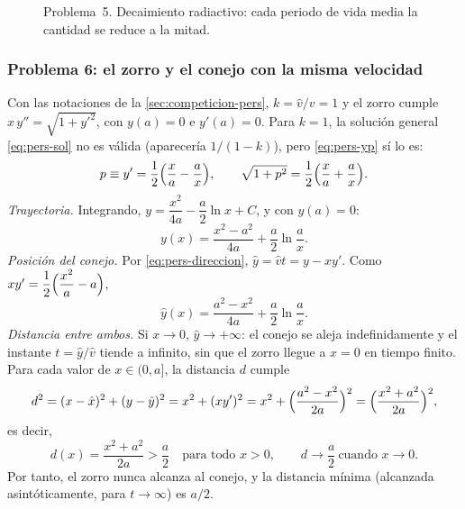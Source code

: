 \begin{figure}[H]
  \centering
  \caption{Problema~5. Decaimiento radiactivo: cada periodo de vida media la cantidad se reduce a la mitad.}
  \label{fig:p5}
\end{figure}

\subsubsection*{Problema 6: el zorro y el conejo con la misma velocidad}

\begin{solucion}
Con las notaciones de la \cref{sec:competicion-pers}, $k=\hat v/v=1$ y el zorro cumple $x\,y''=\sqrt{1+y'^2}$, con $y(a)=0$ e $y'(a)=0$. Para $k=1$, la solución general \eqref{eq:pers-sol} no es válida (aparecería $1/(1-k)$), pero \eqref{eq:pers-yp} sí lo es:
\[
  p\equiv y'=\frac12\Bigl(\frac xa-\frac ax\Bigr),\qquad
  \sqrt{1+p^2}=\frac12\Bigl(\frac xa+\frac ax\Bigr).
\]
\emph{Trayectoria.} Integrando, $y=\dfrac{x^2}{4a}-\dfrac a2\ln x+C$, y con $y(a)=0$:
\[
  y(x)=\frac{x^2-a^2}{4a}+\frac a2\ln\frac ax .
\]
\emph{Posición del conejo.} Por \eqref{eq:pers-direccion}, $\hat y=\hat vt=y-xy'$. Como $xy'=\dfrac12\Bigl(\dfrac{x^2}{a}-a\Bigr)$,
\[
  \hat y(x)=\frac{a^2-x^2}{4a}+\frac a2\ln\frac ax .
\]
\emph{Distancia entre ambos.} Si $x\to0$, $\hat y\to+\infty$: el conejo se aleja indefinidamente y el instante $t=\hat y/\hat v$ tiende a infinito, sin que el zorro llegue a $x=0$ en tiempo finito. Para cada valor de $x\in(0,a]$, la distancia $d$ cumple
\[
  d^2=(x-\hat x)^2+(y-\hat y)^2=x^2+(xy')^2=x^2+\Bigl(\frac{a^2-x^2}{2a}\Bigr)^{2}=\Bigl(\frac{x^2+a^2}{2a}\Bigr)^{2},
\]
es decir,
\begin{equation}
  d(x)=\frac{x^2+a^2}{2a}>\frac a2\quad\text{para todo }x>0,
  \qquad d\to\frac a2\ \text{cuando }x\to0 .
  \label{eq:p6-d}
\end{equation}
Por tanto, el zorro nunca alcanza al conejo, y la distancia mínima (alcanzada asintóticamente, para $t\to\infty$) es $a/2$.
\end{solucion}

